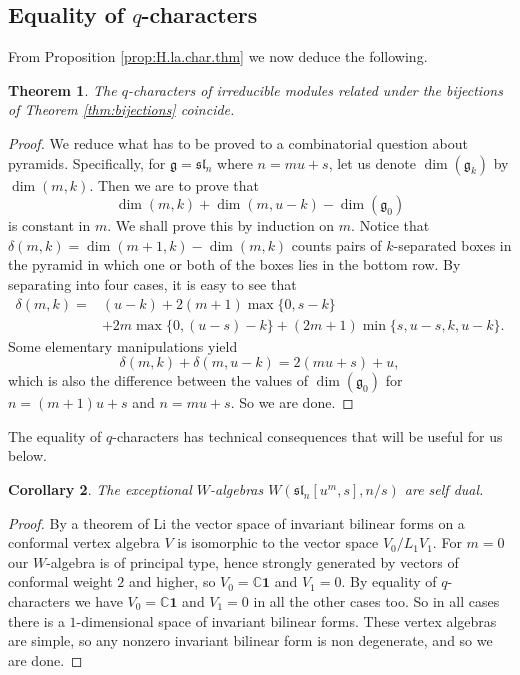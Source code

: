 \documentclass[12pt]{amsart}
\theoremstyle{plain}
\newtheorem{thm}{Theorem}[section]
\newtheorem{cor}[thm]{Corollary}
\theoremstyle{definition}
\numberwithin{equation}{section}
\newcommand{\C}{\mathbb{C}}
\newcommand{\g}{\mathfrak{g}}
\newcommand{\sll}{\mathfrak{sl}}
\newcommand{\vac}{\mathbf{1}}
\begin{document}
\subsection{Equality of $q$-characters}

From Proposition \ref{prop:H.la.char.thm} we now deduce the following.
\begin{thm}\label{thm:q-char-equalities}
The $q$-characters of irreducible modules related under the bijections of Theorem \ref{thm:bijections} coincide.
\end{thm}

\begin{proof}
We reduce what has to be proved to a combinatorial question about pyramids. Specifically, for $\g = \sll_n$ where $n = mu+s$, let us denote $\dim(\g_k)$ by $\dim(m, k)$. Then we are to prove that
\[
\dim(m, k) + \dim(m, u-k) - \dim(\g_0)
\]
is constant in $m$. We shall prove this by induction on $m$. Notice that $\delta(m, k) = \dim(m+1, k)-\dim(m, k)$ counts pairs of $k$-separated boxes in the pyramid in which one or both of the boxes lies in the bottom row. By separating into four cases, it is easy to see that
\begin{align*}
\delta(m, k) = {} & (u-k) + 2(m+1)\max\{0, s-k\} \\
&+ 2m\max\{0, (u-s)-k\} + (2m+1)\min\{s, u-s, k, u-k\}.
\end{align*}
Some elementary manipulations yield
\[
\delta(m, k) + \delta(m, u-k) = 2(mu+s) + u,
\]
which is also the difference between the values of $\dim(\g_0)$ for $n = (m+1)u+s$ and $n=mu+s$. So we are done.
\end{proof}

The equality of $q$-characters has technical consequences that will be useful for us below.
\begin{cor}\label{cor:self.dual}
The exceptional $W$-algebras $W(\sll_n[u^m, s], n/s)$ are self dual.
\end{cor}

\begin{proof}
By a theorem of Li \cite{Li.94} the vector space of invariant bilinear forms on a conformal vertex algebra $V$ is isomorphic to the vector space $V_0 / L_1 V_1$. For $m=0$ our $W$-algebra is of principal type, hence strongly generated by vectors of conformal weight $2$ and higher, so $V_0 = \C\vac$ and $V_1=0$. By equality of $q$-characters we have $V_0 = \C\vac$ and $V_1=0$ in all the other cases too. So in all cases there is a $1$-dimensional space of invariant bilinear forms. These vertex algebras are simple, so any nonzero invariant bilinear form is non degenerate, and so we are done.
\end{proof}
\end{document}
